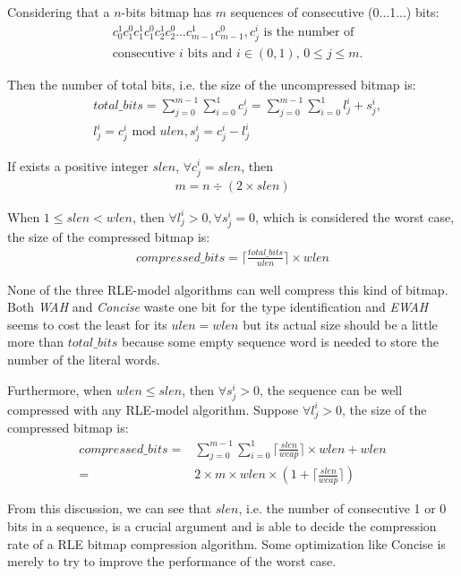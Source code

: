 Considering that a $n$-bits bitmap has $m$ sequences of consecutive (0...1...) bits:
\begin{align*}
& c^1_0c^0_1c^1_1c^0_1c^1_2c^0_2...c^1_{m - 1}c^0_{m - 1}, c^i_j \text{ is the number of } \\
& \text{consecutive } i \text{ bits and } i \in (0, 1),\, 0 \leq j \leq m.  
\end{align*}

Then the number of total bits, i.e. the size of the uncompressed bitmap is:
\begin{align*}
& total\_bits = \sum_{j = 0}^{m - 1} \sum_{i = 0}^1 c^i_j = \sum_{j = 0}^{m - 1} \sum_{i = 0}^1 l^i_j + s^i_j, \\
& l^i_j = c^i_j \text{ mod } ulen, s^i_j = c^i_j - l^i_j
\end{align*}

If exists a positive integer $slen$, $\forall c^i_j = slen$, then
\begin{align}
m = n \div (2 \times slen) \label{eq:seqnum}
\end{align}

When $1 \leq slen < wlen$, then $\forall l^i_j > 0, \forall s^i_j = 0$, which is considered the worst case, the size of the compressed bitmap is:
\begin{align*}
compressed\_bits = \lceil \frac{total\_bits}{ulen} \rceil \times wlen 
\end{align*}

None of the three RLE-model algorithms can well compress this kind of bitmap. Both \emph{WAH} and \emph{Concise} waste one bit for the type identification and \emph{EWAH} seems to cost the least for its $ulen = wlen$ but its actual size should be a little more than $total\_bits$ because some empty sequence word is needed to store the number of the literal words.

Furthermore, when $wlen \leq slen$, then $\forall s^i_j > 0$, the sequence can be well compressed with any RLE-model algorithm. Suppose $\forall l^i_j > 0$, the size of the compressed bitmap is:
\begin{align*}
compressed\_bits = &\sum_{j = 0}^{m - 1} \sum_{i = 0}^1 \lceil \frac{slen}{wcap} \rceil \times wlen + wlen \\
= & 2 \times m \times wlen \times (1 + \lceil \frac{slen}{wcap} \rceil)
\end{align*}

From this discussion, we can see that $slen$, i.e. the number of consecutive 1 or 0 bits in a sequence, is a crucial argument and is able to decide the compression rate of a RLE bitmap compression algorithm. Some optimization like Concise is merely to try to improve the performance of the worst case.

